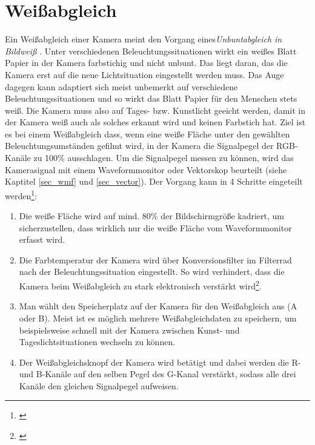 \section{Weißabgleich}
\label{sec_wb}
Ein Weißabgleich einer Kamera meint den Vorgang eines\emph{\glqq Unbuntabgleich in Bildweiß\grqq} \citep[414]{schmidt}. Unter verschiedenen Beleuchtungssituationen wirkt ein weißes Blatt Papier in der Kamera farbstichig und nicht unbunt. Das liegt daran, das die Kamera erst auf die neue Lichtsituation eingestellt werden muss. Das Auge dagegen kann adaptiert sich meist unbemerkt auf verschiedene Beleuchtungssituationen und so wirkt das Blatt Papier für den Menschen stets weiß. Die Kamera muss also auf Tages- bzw. Kunstlicht geeicht werden, damit in der Kamera weiß auch als solches erkannt wird und keinen Farbstich hat. Ziel ist es bei einem Weißabgleich dass, wenn eine weiße Fläche unter den gewählten Beleuchtungsumständen gefilmt wird, in der Kamera die Signalpegel der RGB-Kanäle zu 100\% ausschlagen. Um die Signalpegel messen zu können, wird das Kamerasignal mit einem Waveformmonitor oder Vektorskop beurteilt (siehe Kaptitel \ref{sec_wmf} und \ref{sec_vector}). Der Vorgang kann in 4 Schritte eingeteilt werden\footnote{\cite[206]{heinen}}:

\begin{enumerate}
\item Die weiße Fläche wird auf mind. 80\% der Bildschirmgröße kadriert, um sicherzustellen, dass wirklich nur die weiße Fläche vom Waveformmonitor erfasst wird.
\item Die Farbtemperatur der Kamera wird über Konversionsfilter im Filterrad nach der Beleuchtungssituation eingestellt. So wird verhindert, dass die Kamera beim Weißabgleich zu stark elektronisch verstärkt wird\footnote{\cite[415]{schmidt}}.
\item Man wählt den Speicherplatz auf der Kamera für den Weißabgleich aus (A oder B). Meist ist es möglich mehrere Weißabgleichdaten zu speichern, um beispielsweise schnell mit der Kamera zwischen Kunst- und Tageslichtsituationen wechseln zu können.
\item Der Weißabgleichsknopf der Kamera wird betätigt und dabei werden die R- und B-Kanäle auf den selben Pegel des G-Kanal verstärkt, sodass alle drei Kanäle den gleichen Signalpegel aufweisen.
\end{enumerate}
  

